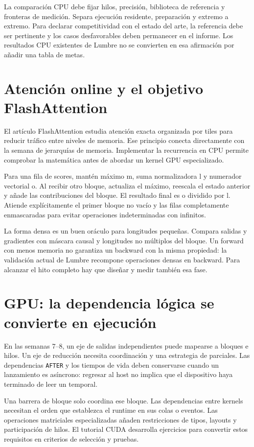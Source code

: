 \documentclass[12pt,a4paper,oneside]{report}
\begin{document}
La comparación CPU debe fijar hilos, precisión, biblioteca de referencia y fronteras de medición. Separa ejecución residente, preparación y extremo a extremo. Para declarar competitividad con el estado del arte, la referencia debe ser pertinente y los casos desfavorables deben permanecer en el informe. Los resultados CPU existentes de Lumbre no se convierten en esa afirmación por añadir una tabla de metas.

\section{Atención online y el objetivo FlashAttention}
El artículo FlashAttention estudia atención exacta organizada por tiles para reducir tráfico entre niveles de memoria. Ese principio conecta directamente con la semana de jerarquías de memoria. Implementar la recurrencia en CPU permite comprobar la matemática antes de abordar un kernel GPU especializado. \cite{flash1}

Para una fila de scores, mantén máximo m, suma normalizadora l y numerador vectorial o. Al recibir otro bloque, actualiza el máximo, reescala el estado anterior y añade las contribuciones del bloque. El resultado final es o dividido por l. Atiende explícitamente el primer bloque no vacío y las filas completamente enmascaradas para evitar operaciones indeterminadas con infinitos.

La forma densa es un buen oráculo para longitudes pequeñas. Compara salidas y gradientes con máscara causal y longitudes no múltiplos del bloque. Un forward con menos memoria no garantiza un backward con la misma propiedad: la validación actual de Lumbre recompone operaciones densas en backward. Para alcanzar el hito completo hay que diseñar y medir también esa fase.

\section{GPU: la dependencia lógica se convierte en ejecución}
En las semanas 7--8, un eje de salidas independientes puede mapearse a bloques e hilos. Un eje de reducción necesita coordinación y una estrategia de parciales. Las dependencias \texttt{AFTER} y los tiempos de vida deben conservarse cuando un lanzamiento es asíncrono: regresar al host no implica que el dispositivo haya terminado de leer un temporal.

Una barrera de bloque solo coordina ese bloque. Las dependencias entre kernels necesitan el orden que establezca el runtime en sus colas o eventos. Las operaciones matriciales especializadas añaden restricciones de tipos, layouts y participación de hilos. El tutorial CUDA desarrolla ejercicios para convertir estos requisitos en criterios de selección y pruebas.
\end{document}

